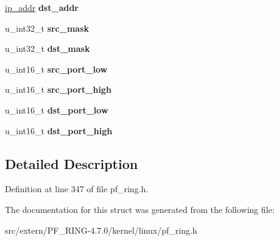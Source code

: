 \begin{DoxyCompactItemize}
\item 
\hypertarget{structsilicom__redirector__hw__rule_a60435be93be076d43b09d100a855ec2d}{
\hyperlink{unionip__addr}{ip\_\-addr} {\bfseries dst\_\-addr}}
\label{structsilicom__redirector__hw__rule_a60435be93be076d43b09d100a855ec2d}

\item 
\hypertarget{structsilicom__redirector__hw__rule_a3f7b67204d35c9c9f398811359f33d40}{
u\_\-int32\_\-t {\bfseries src\_\-mask}}
\label{structsilicom__redirector__hw__rule_a3f7b67204d35c9c9f398811359f33d40}

\item 
\hypertarget{structsilicom__redirector__hw__rule_af4b11b50fcf05402e5a733444b56d60f}{
u\_\-int32\_\-t {\bfseries dst\_\-mask}}
\label{structsilicom__redirector__hw__rule_af4b11b50fcf05402e5a733444b56d60f}

\item 
\hypertarget{structsilicom__redirector__hw__rule_a3a177c2446886e75e811bd97e2998f81}{
u\_\-int16\_\-t {\bfseries src\_\-port\_\-low}}
\label{structsilicom__redirector__hw__rule_a3a177c2446886e75e811bd97e2998f81}

\item 
\hypertarget{structsilicom__redirector__hw__rule_a8a6a778835bba5a4edbb39a591ea542b}{
u\_\-int16\_\-t {\bfseries src\_\-port\_\-high}}
\label{structsilicom__redirector__hw__rule_a8a6a778835bba5a4edbb39a591ea542b}

\item 
\hypertarget{structsilicom__redirector__hw__rule_a6959a1e80c1917920a74b1081fbd6833}{
u\_\-int16\_\-t {\bfseries dst\_\-port\_\-low}}
\label{structsilicom__redirector__hw__rule_a6959a1e80c1917920a74b1081fbd6833}

\item 
\hypertarget{structsilicom__redirector__hw__rule_a221fdbfa81db12565bafda7e5a83849c}{
u\_\-int16\_\-t {\bfseries dst\_\-port\_\-high}}
\label{structsilicom__redirector__hw__rule_a221fdbfa81db12565bafda7e5a83849c}

\end{DoxyCompactItemize}


\subsection{Detailed Description}


Definition at line 347 of file pf\_\-ring.h.



The documentation for this struct was generated from the following file:\begin{DoxyCompactItemize}
\item 
src/extern/PF\_\-RING-\/4.7.0/kernel/linux/pf\_\-ring.h\end{DoxyCompactItemize}
